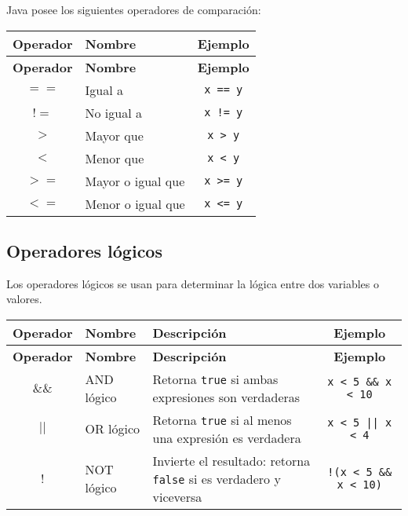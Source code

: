 \documentclass[12pt]{article}
\theoremstyle{largebreak}
\begin{document}
    Java posee los siguientes operadores de comparación:

    \begin{longtable}{c l c}
    \toprule
    \textbf{Operador} & \textbf{Nombre} & \textbf{Ejemplo} \\
    \midrule
    \endfirsthead

    \midrule
    \textbf{Operador} & \textbf{Nombre} & \textbf{Ejemplo} \\
    \midrule
    \endhead

    \bottomrule
    \endfoot

    $==$ & Igual a & \lstinline|x == y| \\
    $!=$ & No igual a & \lstinline|x != y| \\
    $>$ & Mayor que & \lstinline|x > y| \\
    $<$ & Menor que & \lstinline|x < y| \\
    $>=$ & Mayor o igual que & \lstinline|x >= y| \\
    $<=$ & Menor o igual que & \lstinline|x <= y| \\
    \end{longtable}

    \subsection{Operadores lógicos}

    Los operadores lógicos se usan para determinar la lógica entre dos variables o valores.

    \begin{longtable}{c l p{} c}
    \toprule
    \textbf{Operador} & \textbf{Nombre} & \textbf{Descripción} & \textbf{Ejemplo} \\
    \midrule
    \endfirsthead

    \midrule
    \textbf{Operador} & \textbf{Nombre} & \textbf{Descripción} & \textbf{Ejemplo} \\
    \midrule
    \endhead

    \bottomrule
    \endfoot

    $\&\&$ & AND lógico & Retorna \lstinline|true| si ambas expresiones son verdaderas & \lstinline|x < 5 && x < 10| \\
    $||$ & OR lógico & Retorna \lstinline|true| si al menos una expresión es verdadera & \texttt{x < 5 || x < 4} \\
    $!$ & NOT lógico & Invierte el resultado: retorna \lstinline|false| si es verdadero y viceversa & \lstinline|!(x < 5 && x < 10)| \\
    \end{longtable}
\end{document}
